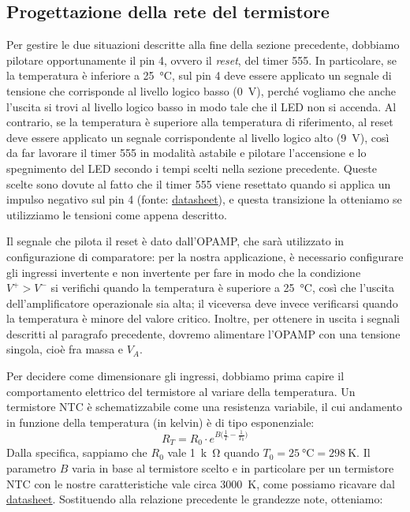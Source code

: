 \documentclass{report}
\begin{document}
\subsection{Progettazione della rete del termistore}\label{rete_termistore}
Per gestire le due situazioni descritte alla fine della sezione precedente, dobbiamo pilotare opportunamente il pin 4, ovvero il \textit{reset}, del timer 555. In particolare, se la temperatura è inferiore a \SI{25}{\celsius}, sul pin 4 deve essere applicato un segnale di tensione che corrisponde al livello logico basso (\SI{0}{\volt}), perché vogliamo che anche l'uscita si trovi al livello logico basso in modo tale che il LED non si accenda. Al contrario, se la temperatura è superiore alla temperatura di riferimento, al reset deve essere applicato un segnale corrispondente al livello logico alto (\SI{9}{\volt}), così da far lavorare il timer 555 in modalità astabile e pilotare l'accensione e lo spegnimento del LED secondo i tempi scelti nella sezione precedente. Queste scelte sono dovute al fatto che il timer 555 viene resettato quando si applica un impulso negativo sul pin 4 (fonte: \textcolor{blue}{\underline{\href{https://www.ti.com/lit/ds/symlink/lm555.pdf?ts=1667144089940&ref_url=https\%253A\%252F\%252Fwww.ti.com\%252Fproduct\%252FLM555}{datasheet}}}), e questa transizione la otteniamo se utilizziamo le tensioni come appena descritto. \par
Il segnale che pilota il reset è dato dall'OPAMP, che sarà utilizzato in configurazione di comparatore: per la nostra applicazione, è necessario configurare gli ingressi invertente e non invertente per fare in modo che la condizione $V^+>V^-$ si verifichi quando la temperatura è superiore a \SI{25}{\celsius}, così che l'uscita dell'amplificatore operazionale sia alta; il viceversa deve invece verificarsi quando la temperatura è minore del valore critico. Inoltre, per ottenere in uscita i segnali descritti al paragrafo precedente, dovremo alimentare l'OPAMP con una tensione singola, cioè fra massa e $V_A$. \par
Per decidere come dimensionare gli ingressi, dobbiamo prima capire il comportamento elettrico del termistore al variare della temperatura. Un termistore NTC è schematizzabile come una resistenza variabile, il cui andamento in funzione della temperatura (in kelvin) è di tipo esponenziale:
$$ R_T = R_0\cdot e^{B\bigl(\frac{1}{T}-\frac{1}{T_0}\bigr)}$$
Dalla specifica, sappiamo che $R_0$ vale \SI{1}{k\ohm} quando $T_0 = \SI{25}{\celsius}=\SI{298}{\kelvin}$. Il parametro $B$ varia in base al termistore scelto e in particolare per un termistore NTC con le nostre caratteristiche vale circa \SI{3000}{\kelvin}, come possiamo ricavare dal \textcolor{blue}{\underline{\href{https://www.mouser.it/datasheet/2/240/Littelfuse_Leaded_Thermistors_Glass_Encapsulated_T-1315924.pdf}{datasheet}}}. Sostituendo alla relazione precedente le grandezze note, otteniamo:
\end{document}
